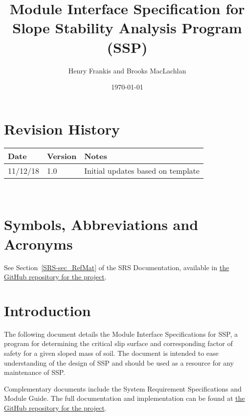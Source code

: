 \documentclass[12pt, titlepage]{article}
\newcommand{\progname}{SSP}
\begin{document}
\title{Module Interface Specification for Slope Stability Analysis Program 
(\progname)} 
\author{Henry Frankis and Brooks MacLachlan}
\date{\today}
	
\maketitle


\section{Revision History}

\begin{tabularx}{\textwidth}{p{3cm}p{2cm}X}
	\toprule {\bf Date} & {\bf Version} & {\bf Notes}\\
	\midrule
	11/12/18 & 1.0 & Initial updates based on template\\
	\bottomrule
\end{tabularx}

~\newpage

\section{Symbols, Abbreviations and Acronyms}

See Section~\ref{SRS-sec_RefMat} of the SRS Documentation, available in
\href{https://github.com/smiths/caseStudies/blob/master/CaseStudies/ssp/docs/SRS/SRS.pdf}
{the GitHub repository for the project}.

\newpage

\tableofcontents

\newpage


\section{Introduction}

The following document details the Module Interface Specifications for
\progname, a program for determining the critical slip surface and 
corresponding factor of safety for a given sloped mass of soil. The document is 
intended to ease understanding of the design of \progname{} and should be used 
as a resource for any maintenance of \progname{}.

Complementary documents include the System Requirement Specifications
and Module Guide.  The full documentation and implementation can be
found at 
\href{https://github.com/smiths/caseStudies/tree/master/CaseStudies/ssp}
{the GitHub repository for the project}.
\end{document}

